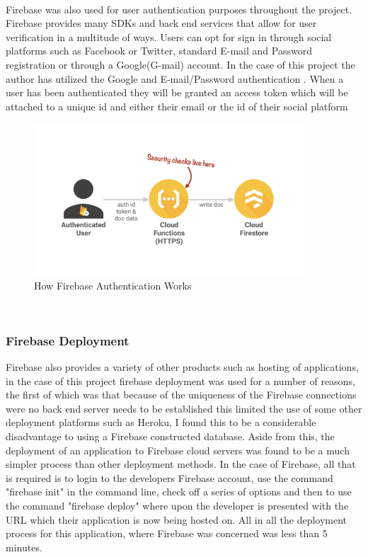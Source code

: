 \paragraph{}
Firebase was also used for user authentication purposes throughout the project. Firebase provides many SDKs and back end services that allow for user verification in a multitude of ways. Users can opt for sign in through social platforms such as Facebook or Twitter, standard E-mail and Password registration or through a Google(G-mail) account. In the case of this project the author has utilized the Google and E-mail/Password authentication \cite{fireauth}. When a user has been authenticated they will be granted an access token which will be attached to a unique id and either their email or the id of their social platform \\

\newpage
\begin{figure}[h!]
    	\caption{How Firebase Authentication Works}
	\centering
	\includegraphics[width=0.9\textwidth]{images/fireauth.png}
\end{figure}
\\

\subsubsection{Firebase Deployment}
Firebase also provides a variety of other products such as hosting of applications, in the case of this project firebase deployment was used for a number of reasons, the first of which was that because of the uniqueness of the Firebase connections were no back end server needs to be established this limited the use of some other deployment platforms such as Heroku, I found this to be a considerable disadvantage to using a Firebase constructed database. Aside from this, the deployment of an application to Firebase cloud servers was found to be a much simpler process than other deployment methods. In the case of Firebase, all that is required is to login to the developers Firebase account, use the command "firebase init" in the command line, check off a series of options and then to use the command "firebase deploy" \cite{firedeploy} where upon the developer is presented with the URL which their application is now being hosted on. All in all the deployment process for this application, where Firebase was concerned was less than 5 minutes. \\

